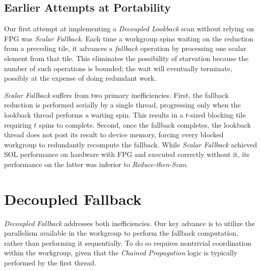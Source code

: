 \documentclass[acmsmall, manuscript, screen, review, anonymous]{acmart}
\begin{document}
\subsection{Earlier Attempts at Portability}
Our first attempt at implementing a \emph{Decoupled Lookback} scan without relying on FPG was \emph{Scalar Fallback}. Each time a workgroup spins waiting on the reduction from a preceding tile, it advances a \emph{fallback} operation by processing one scalar element from that tile. This eliminates the possibility of starvation because the number of such operations is bounded; the wait will eventually terminate, possibly at the expense of doing redundant work.

\emph{Scalar Fallback} suffers from two primary inefficiencies. First, the fallback reduction is performed serially by a single thread, progressing only when the lookback thread performs a waiting spin. This results in a $t$-sized blocking tile requiring $t$ spins to complete. Second, once the fallback completes, the lookback thread does not post its result to device memory, forcing every blocked workgroup to redundantly recompute the fallback. While \emph{Scalar Fallback} achieved SOL performance on hardware with FPG and executed correctly without it, its performance on the latter was inferior to \emph{Reduce-then-Scan}.

\section{Decoupled Fallback}
\emph{Decoupled Fallback} addresses both inefficiencies. Our key advance is to utilize the parallelism available in the workgroup to perform the fallback computation, rather than performing it sequentially. To do so requires nontrivial coordination within the workgroup, given that the \emph{Chained Propagation} logic is typically performed by the first thread.
\end{document}
